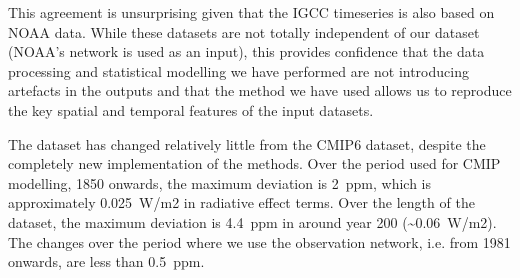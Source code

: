 This agreement is unsurprising given that the IGCC timeseries is also based on NOAA data.
While these datasets are not totally independent of our dataset (NOAA's network is used as an input),
this provides confidence that the data processing and statistical modelling we have performed are not introducing artefacts in the outputs
and that the method we have used allows us to reproduce the key spatial and temporal features of the input datasets.

The dataset has changed relatively little from the CMIP6 dataset, despite the completely new implementation of the methods.
Over the period used for CMIP modelling, 1850 onwards, the maximum deviation is 2~ppm, which is approximately 0.025~W/m2 in radiative effect terms.
Over the length of the dataset, the maximum deviation is 4.4~ppm in around year 200 (\textasciitilde{}0.06~W/m2).
The changes over the period where we use the observation network, i.e. from 1981 onwards, are less than 0.5~ppm.

